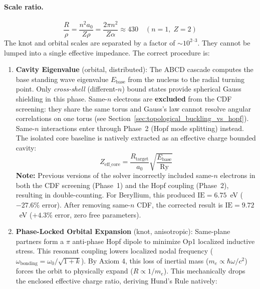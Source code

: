 \paragraph{Scale ratio.}
\begin{equation}
    \frac{R}{\rho} = \frac{n^2 a_0}{Z \rho}
    = \frac{2\pi n^2}{Z \alpha}
    \approx 430 \quad (n = 1,\; Z = 2)
    \label{eq:scale_ratio}
\end{equation}
The knot and orbital scales are separated by a factor of
$\sim 10^{2\text{--}3}$.  They cannot be lumped into a
single effective impedance.  The correct procedure is:
\begin{enumerate}
    \item \textbf{Cavity Eigenvalue} (orbital, distributed):
          The ABCD cascade computes the base standing wave eigenvalue $E_{\text{base}}$ from the nucleus to the radial turning point. Only \emph{cross-shell} (different-$n$) bound states provide spherical Gauss shielding in this phase.  Same-$n$ electrons are \textbf{excluded} from the CDF screening: they share the same torus and Gauss's law cannot resolve angular correlations on one torus (see Section~\ref{sec:topological_buckling_vs_hopf}). Same-$n$ interactions enter through Phase~2 (Hopf mode splitting) instead. The isolated core baseline is natively extracted as an effective charge bounded cavity:
          \begin{equation}
              Z_{\text{eff\_core}} = \frac{R_{\text{target}}}{a_0} \sqrt{\frac{E_{\text{base}}}{\text{Ry}}}
          \end{equation}
          \textbf{Note:} Previous versions of the solver incorrectly included same-$n$ electrons in both the CDF screening (Phase~1) and the Hopf coupling (Phase~2), resulting in double-counting.  For Beryllium, this produced $\text{IE} = 6.75$~eV ($-27.6\%$ error).  After removing same-$n$ CDF, the corrected result is $\text{IE} = 9.72$~eV ($+4.3\%$ error, zero free parameters).
    \item \textbf{Phase-Locked Orbital Expansion} (knot, anisotropic):
          Same-plane partners form a $\pi$ anti-phase Hopf dipole to minimize Op1 localized inductive stress. This resonant coupling lowers localized nodal frequency ($\omega_{\text{bonding}} = \omega_0 / \sqrt{1+k}$). By Axiom 4, this loss of inertial mass ($m_e \propto \hbar\omega/c^2$) forces the orbit to physically expand ($R \propto 1/m_e$). This mechanically drops the enclosed effective charge ratio, deriving Hund's Rule natively:
          \begin{equation}

\end{equation}
\end{enumerate}
